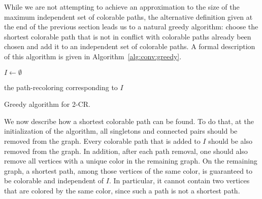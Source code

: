 While we are not attempting to achieve an approximation to the size
of the maximum independent set of colorable paths,
the alternative definition given at the end of the previous section
leads us to a natural greedy algorithm: 
choose the shortest colorable path that 
is not in conflict with colorable paths already been chosen and add it
to an independent set of colorable paths.
%
A formal description of this algorithm is given in
Algorithm~\ref{alg:conv:greedy}.



\begin{algorithm}
$I \gets \emptyset$

\Return the path-recoloring corresponding to $I$

\caption[Greedy algorithm for 2-CR]{Greedy algorithm for 2-CR.}
\label{alg:conv:greedy}
\end{algorithm}


We now describe how a shortest colorable path can be found.
%
To do that, 
at the initialization of the algorithm, 
all singletons and connected pairs should be removed from the graph.  
%
Every colorable path that is added to $I$ should be also removed from the graph.  
%
In addition, 
after each path removal, 
one should also remove all vertices with a unique color in the remaining graph.  
%
On the remaining graph, 
a shortest path, 
among those vertices of the same color, 
is guaranteed to be colorable and independent of $I$.
%
In particular,
it cannot contain two vertices that are colored by the same color, 
since such a path is not a shortest path.
